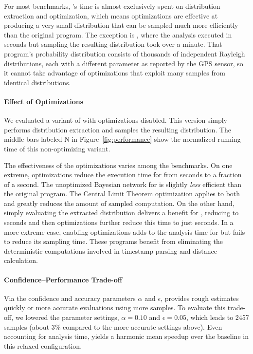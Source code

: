 For most benchmarks, \tool's time is almost exclusively spent on distribution
extraction and optimization, which means optimizations are effective at
producing a very small distribution that can be sampled much more efficiently
than the original program.
The exception is , where the analysis executed in
 seconds
but sampling the resulting distribution took over a minute.
That program's probability distribution consists of thousands of independent
Rayleigh distributions, each with a different parameter as reported by the GPS
sensor, so it cannot take advantage of optimizations that exploit many
samples from identical distributions.

\paragraph{Effect of Optimizations}
We evaluated a variant of \tool with optimizations disabled. This
version simply performs distribution extraction and samples the
resulting distribution.  The middle bars labeled N in
Figure~\ref{fig:performance} show the normalized running time of this
non-optimizing \tool variant.

The effectiveness of the optimizations varies among the benchmarks. %
On one extreme, optimizations
reduce the execution time for  from
 seconds to a fraction of a second.
The unoptimized Bayesian network for  is slightly
\emph{less} efficient than the original program.  The Central Limit
Theorem optimization applies to both and greatly reduces the amount of
sampled computation.  On the other hand, simply evaluating the
extracted distribution delivers a benefit for ,
reducing  to
 seconds and then optimizations
further reduce this time to just 
seconds.
In a more extreme case, enabling optimizations adds to the analysis time for
 but fails to reduce its sampling time.
These programs benefit from eliminating the deterministic
computations involved in timestamp parsing and distance calculation.

\paragraph{Confidence--Performance Trade-off}

Via the confidence and accuracy parameters $\alpha$ and $\epsilon$, \tool
provides rough estimates quickly or more accurate evaluations
using more samples.
To evaluate this trade-off, we lowered the
parameter settings, $\alpha = 0.10$ and $\epsilon = 0.05$, which leads to 2457
samples (about 3\% compared to the more accurate settings above).
Even accounting for analysis time, \tool yields a harmonic mean
speedup over the baseline in this relaxed configuration.
